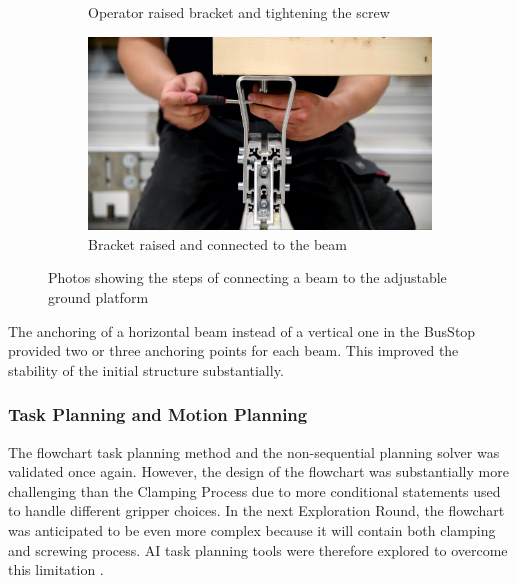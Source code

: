 \begin{figure}[!h]
\begin{subfigure}[b]{0.49\textwidth}
        \caption{Operator raised bracket and tightening the screw}
        \label{fig:operator-raised-bracket-and-tightening-the-screw}
    \end{subfigure}
    \begin{subfigure}[b]{0.49\textwidth}
        \centering
        \includegraphics[width=\textwidth]{images/7b/img65.jpg}
        \caption{Bracket raised and connected to the beam}
        \label{fig:bracket-raised-to-the-beam}
    \end{subfigure}
    \caption{Photos showing the steps of connecting a beam to the adjustable ground platform}
    \label{fig:ground-platform-attachment}
\end{figure}

The anchoring of a horizontal beam instead of a vertical one in the BusStop  provided two or three anchoring points for each beam. This improved the stability of the initial structure substantially.

\subsubsection{Task Planning and Motion Planning}
\label{subsubsection:exploration-4-task-planning-and-motion-planning}

The flowchart task planning method  and the non-sequential planning solver  was validated once again. However, the design of the flowchart  was substantially more challenging than the Clamping Process due to more conditional statements used to handle different gripper choices. 
In the next Exploration Round, the flowchart was anticipated to be even more complex because it will contain both clamping and screwing process. AI task planning tools were therefore explored to overcome this limitation . 

